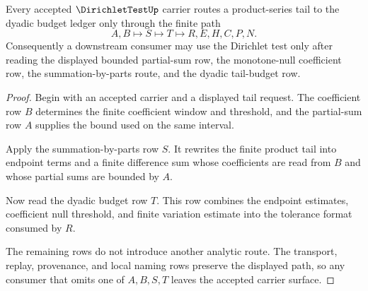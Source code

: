 \begin{theorem}
\label{thm:dirichlet-test-summation-by-parts-route}
Every accepted $\DirichletTestUp$ carrier routes a product-series tail to the dyadic budget ledger only through the finite path
$$
A,B \longmapsto S \longmapsto T \longmapsto R,E,H,C,P,N.
$$
Consequently a downstream consumer may use the Dirichlet test only after reading the displayed bounded partial-sum row, the monotone-null coefficient row, the summation-by-parts route, and the dyadic tail-budget row.
\end{theorem}
\begin{proof}
Begin with an accepted carrier and a displayed tail request. The coefficient row $B$ determines the finite coefficient window and threshold, and the partial-sum row $A$ supplies the bound used on the same interval.

Apply the summation-by-parts row $S$. It rewrites the finite product tail into endpoint terms and a finite difference sum whose coefficients are read from $B$ and whose partial sums are bounded by $A$.

Now read the dyadic budget row $T$. This row combines the endpoint estimates, coefficient null threshold, and finite variation estimate into the tolerance format consumed by $R$.

The remaining rows do not introduce another analytic route. The transport, replay, provenance, and local naming rows preserve the displayed path, so any consumer that omits one of $A,B,S,T$ leaves the accepted carrier surface.
\end{proof}

